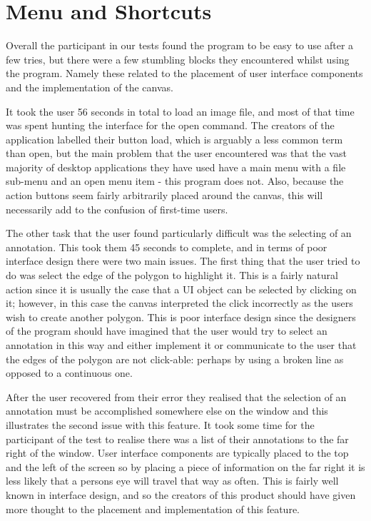 \section{Menu and Shortcuts}

Overall the participant in our tests found the program to be easy to use after a few tries, but there were a few stumbling blocks they encountered whilst using the program.  Namely these related to the placement of user interface components and the implementation of the canvas.

It took the user 56 seconds in total to load an image file, and most of that time was spent hunting the interface for the open command.  The creators of the application labelled their button load, which is arguably a less common term than open, but the main problem that the user encountered was that the vast majority of desktop applications they have used have a main menu with a file sub-menu and an open menu item - this program does not.  Also, because the action buttons seem fairly arbitrarily placed around the canvas, this will necessarily add to the confusion of first-time users.

The other task that the user found particularly difficult was the selecting of an annotation.  This took them 45 seconds to complete, and in terms of poor interface design there were two main issues.  The first thing that the user tried to do was select the edge of the polygon to highlight it.  This is a fairly natural action since it is usually the case that a UI object can be selected by clicking on it; however, in this case the canvas interpreted the click incorrectly as the users wish to create another polygon.  This is poor interface design since the designers of the program should have imagined that the user would try to select an annotation in this way and either implement it or communicate to the user that the edges of the polygon are not click-able: perhaps by using a broken line as opposed to a continuous one. 

After the user recovered from their error they realised that the selection of an annotation must be accomplished somewhere else on the window and this illustrates the second issue with this feature. It took some time for the participant of the test to realise there was a list of their annotations to the far right of the window.  User interface components are typically placed to the top and the left of the screen so by placing a piece of information on the far right it is less likely that a persons eye will travel that way as often.  This is fairly well known in interface design, and so the creators of this product should have given more thought to the placement and implementation of this feature.
